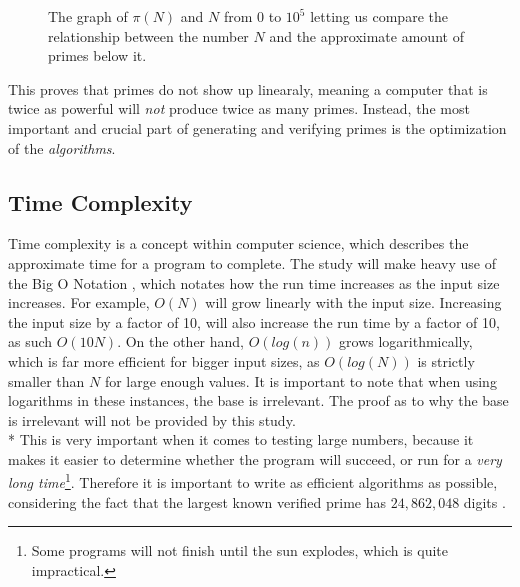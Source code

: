 \documentclass[main.tex]{subfiles}
\begin{document}
\begin{figure}
    \begin{center}
    \end{center}
\caption{The graph of $\pi(N)$ and $N$ from $0$ to $10^{5}$ letting us compare the relationship between the number $N$ and the approximate amount of primes below it.}
\end{figure}

This proves that primes do not show up linearaly, meaning a computer that is twice as powerful will \textit{not} produce twice as many primes. Instead, the most important and crucial part of generating and verifying primes is the optimization of the \textit{algorithms}.

\subsection{Time Complexity}

Time complexity \cite{theorem:time_comp} is a concept within computer science, which describes the approximate time for a program to complete. The study will make heavy use of the Big O Notation \cite{theorem:big_O}, which notates how the run time increases as the input size increases. For example, $O(N)$ will grow linearly with the input size. Increasing the input size by a factor of 10, will also increase the run time by a factor of 10, as such $O(10N)$. On the other hand, $O(log(n))$ grows logarithmically, which is far more efficient for bigger input sizes, as $O(log(N))$ is strictly smaller than $N$ for large enough values. It is important to note that when using logarithms in these instances, the base is irrelevant. The proof as to why the base is irrelevant will not be provided by this study.
\newline
\\*
This is very important when it comes to testing large numbers, because it makes it easier to determine whether the program will succeed, or run for a \textit{very long time}\footnote{Some programs will not finish until the sun explodes, which is quite impractical.}. Therefore it is important to write as efficient algorithms as possible, considering the fact that the largest known verified prime has $24,862,048$ digits \cite{prime:largest_digits}. 
\end{document}
